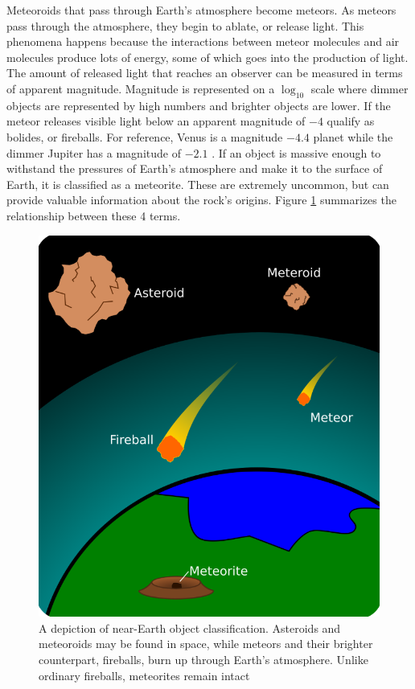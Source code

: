Meteoroids that pass through Earth's atmosphere become meteors.
As meteors pass through the atmosphere, they begin to ablate, or release light.
This phenomena happens because the interactions between meteor molecules and air molecules produce lots of energy, some of which goes into the production of light.
The amount of released light that reaches an observer can be measured in terms of apparent magnitude.
Magnitude is represented on a $\log_10$ scale where dimmer objects are represented by high numbers and brighter objects are lower.  
If the meteor releases visible light below an apparent magnitude of $-4$ qualify as bolides, or fireballs.
For reference, Venus is a magnitude $-4.4$ planet while the dimmer Jupiter has a magnitude of $-2.1$ \cite{rao_venus_nodate}.
If an object is massive enough to withstand the pressures of Earth's atmosphere and make it to the surface of Earth, it is classified as a meteorite. 
These are extremely uncommon, but can provide valuable information about the rock's origins.
Figure \ref{jed} summarizes the relationship between these 4 terms.

\begin{figure}[ht!]
  \centering
  \includegraphics[scale=0.3]{images/jed_zoomedin.png}
  \caption{A depiction of near-Earth object classification.  Asteroids and meteoroids may be found in space, while meteors and their brighter counterpart, fireballs, burn up through Earth's atmosphere.  Unlike ordinary fireballs, meteorites remain intact }
  \label{jed}
\end{figure}

